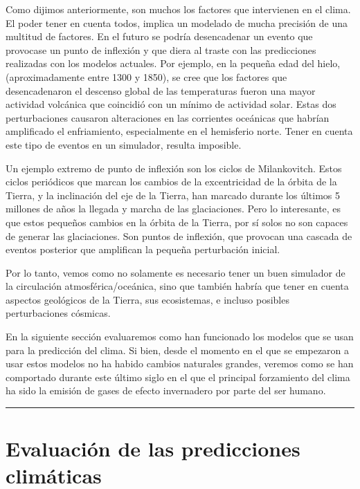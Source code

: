 \documentclass[
  11pt,
  a4paper,
  DIV=11,
  numbers=noendperiod]{scrreprt}
\begin{document}
Como dijimos anteriormente, son muchos los factores que intervienen en
el clima. El poder tener en cuenta todos, implica un modelado de mucha
precisión de una multitud de factores. En el futuro se podría
desencadenar un evento que provocase un punto de inflexión y que diera
al traste con las predicciones realizadas con los modelos actuales. Por
ejemplo, en la pequeña edad del hielo, (aproximadamente entre 1300 y
1850), se cree que los factores que desencadenaron el descenso global de
las temperaturas fueron una mayor actividad volcánica que coincidió con
un mínimo de actividad solar. Estas dos perturbaciones causaron
alteraciones en las corrientes oceánicas que habrían amplificado el
enfriamiento, especialmente en el hemisferio norte. Tener en cuenta este
tipo de eventos en un simulador, resulta imposible.

Un ejemplo extremo de punto de inflexión son los ciclos de Milankovitch.
Estos ciclos periódicos que marcan los cambios de la excentricidad de la
órbita de la Tierra, y la inclinación del eje de la Tierra, han marcado
durante los últimos 5 millones de años la llegada y marcha de las
glaciaciones. Pero lo interesante, es que estos pequeños cambios en la
órbita de la Tierra, por sí solos no son capaces de generar las
glaciaciones. Son puntos de inflexión, que provocan una cascada de
eventos posterior que amplifican la pequeña perturbación inicial.

Por lo tanto, vemos como no solamente es necesario tener un buen
simulador de la circulación atmosférica/oceánica, sino que también
habría que tener en cuenta aspectos geológicos de la Tierra, sus
ecosistemas, e incluso posibles perturbaciones cósmicas.

En la siguiente sección evaluaremos como han funcionado los modelos que
se usan para la predicción del clima. Si bien, desde el momento en el
que se empezaron a usar estos modelos no ha habido cambios naturales
grandes, veremos como se han comportado durante este último siglo en el
que el principal forzamiento del clima ha sido la emisión de gases de
efecto invernadero por parte del ser humano.

\begin{center}\rule{0.5\linewidth}{0.5pt}\end{center}

\chapter{Evaluación de las predicciones
climáticas}\label{evaluaciuxf3n-de-las-predicciones-climuxe1ticas}
\end{document}
